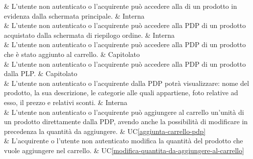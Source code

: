  & L'utente non autenticato o l'acquirente può accedere alla  di un prodotto in evidenza dalla schermata principale. & Interna \\

 & L'utente non autenticato o l'acquirente può accedere alla PDP di un prodotto acquistato dalla schermata di riepilogo ordine. & Interna \\

 & L'utente non autenticato o l'acquirente può accedere alla PDP di un prodotto che è stato aggiunto al carrello. & Capitolato \\

 & L'utente non autenticato o l'acquirente può accedere alla PDP di un prodotto dalla PLP. & Capitolato \\

 & L'utente non autenticato o l'acquirente dalla PDP potrà visualizzare: nome del prodotto, la sua descrizione, le categorie alle quali appartiene, foto relative ad esso, il prezzo e relativi sconti. & Interna \\

 & L'utente non autenticato o l'acquirente può aggiungere al carrello un'unità di un prodotto direttamente dalla PDP, avendo anche la possibilità di modificare in precedenza la quantità da aggiungere. & UC\ref{aggiunta-carrello-pdp} \\

 & L'acquirente o l'utente non autenticato modifica la quantità del prodotto che vuole aggiungere nel carrello. & UC\ref{modifica-quantita-da-aggiungere-al-carrello} \\

